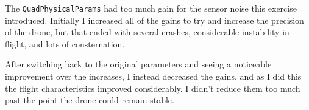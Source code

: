 \documentclass{article}
\begin{document}
The \texttt{QuadPhysicalParams} had too much gain for the sensor noise
this exercise introduced. Initially I increased all of the gains to
try and increase the precision of the drone, but that ended with
several crashes, considerable instability in flight, and lots
of consternation.

After switching back to the original parameters and seeing
a noticeable improvement over the increases, I instead decreased the
gains, and as I did this the flight characteristics
improved considerably. I didn’t reduce them too much past the point
the drone could remain stable.
\end{document}
